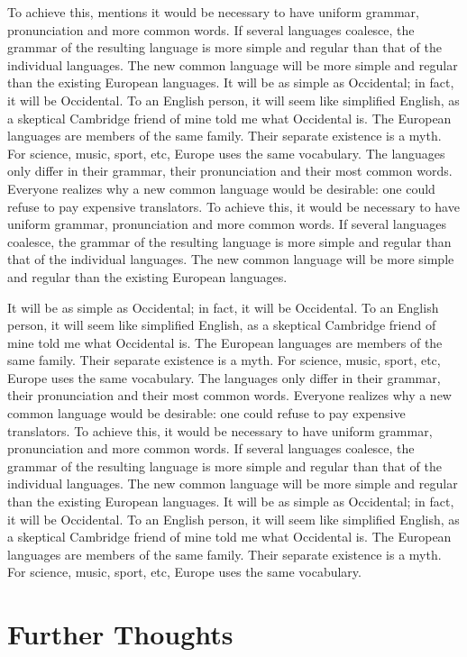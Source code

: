 To achieve this,  \citet{Mayer_2002} mentions it would be necessary to have uniform grammar, pronunciation and more common words. If several languages coalesce, the grammar of the resulting language is more simple and regular than that of the individual languages. The new common language will be more simple and regular than the existing European languages. It will be as simple as Occidental; in fact, it will be Occidental. To an English person, it will seem like simplified English, as a skeptical Cambridge friend of mine told me what Occidental is. The European languages are members of the same family. Their separate existence is a myth. For science, music, sport, etc, Europe uses the same vocabulary. The languages only differ in their grammar, their pronunciation and their most common words. Everyone realizes why a new common language would be desirable: one could refuse to pay expensive translators. To achieve this, it would be necessary to have uniform grammar, pronunciation and more common words. If several languages coalesce, the grammar of the resulting language is more simple and regular than that of the individual languages. The new common language will be more simple and regular than the existing European languages.

It will be as simple as Occidental; in fact, it will be Occidental. To an English person, it will seem like simplified English, as a skeptical Cambridge friend of mine told me what Occidental is. The European languages are members of the same family. Their separate existence is a myth. For science, music, sport, etc, Europe uses the same vocabulary. The languages only differ in their grammar, their pronunciation and their most common words. Everyone realizes why a new common language would be desirable: one could refuse to pay expensive translators. To achieve this, it would be necessary to have uniform grammar, pronunciation and more common words. If several languages coalesce, the grammar of the resulting language is more simple and regular than that of the individual languages. The new common language will be more simple and regular than the existing European languages. It will be as simple as Occidental; in fact, it will be Occidental. To an English person, it will seem like simplified English, as a skeptical Cambridge friend of mine told me what Occidental is. The European languages are members of the same family. Their separate existence is a myth. For science, music, sport, etc, Europe uses the same vocabulary.

\section{Further Thoughts}
\label{furtherthoughts}

